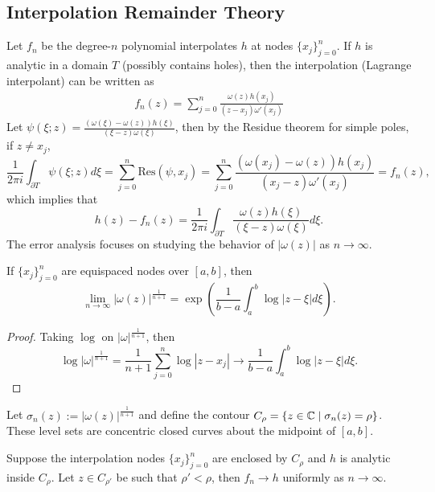 \subsection{Interpolation Remainder Theory}
\label{SSec: 2-Int-Rem-The}
Let $f_n$ be the degree-$n$ polynomial interpolates $h$ at nodes $\{x_j\}_{j=0}^n$. If $h$ is analytic in a domain $T$ (possibly contains holes),  then the interpolation (Lagrange interpolant) can be written as 
\begin{eqnarray}
    f_n(z) = \sum_{j=0}^n \frac{\omega(z) h(x_j)}{(z - x_j) \omega'(x_j)}
\end{eqnarray}
Let $\psi(\xi; z) = \frac{(\omega(\xi) - \omega(z)) h(\xi)}{(\xi - z) \omega(\xi)}$, then by the Residue theorem for simple poles, if $z \neq x_j$,  
\begin{equation}
    \frac{1}{2\pi i}\int_{\partial T} \psi(\xi; z) d\xi = \sum_{j=0}^n \mathrm{Res}(\psi, x_j) = \sum_{j=0}^n \frac{(\omega(x_j) - \omega(z)) h(x_j)}{(x_j - z)\omega'(x_j)} = f_n(z),
\end{equation}
which implies that 
\begin{equation}
    h(z) - f_n(z) = \frac{1}{2\pi i}\int_{\partial T} \frac{\omega(z) h(\xi)}{(\xi - z)\omega(\xi)} d\xi.
\end{equation}
The error analysis focuses on studying the behavior of $|\omega(z)|$ as $n\to \infty$.
\begin{lemma}
\label{Lem: 2-Ome-Lim}
    If $\{x_j\}_{j=0}^n$ are equispaced nodes over $[a, b]$, then 
    \begin{equation}
        \lim_{n\to\infty} |\omega(z)|^{\frac{1}{n+1}} = \exp\left(\frac{1}{b - a}\int_a^b \log|z-\xi| d\xi \right).
    \end{equation}
\end{lemma}
\begin{proof}
    Taking $\log$ on $|\omega|^{\frac{1}{n+1}}$, then 
    \begin{equation}
        \log |\omega|^{\frac{1}{n+1}} = \frac{1}{n+1}\sum_{j=0}^n \log |z - x_j|\to \frac{1}{b-a}\int_a^b \log|z - \xi| d\xi. 
    \end{equation}
\end{proof}
Let $\sigma_n(z):= |\omega(z)|^{\frac{1}{n+1}}$ and define the contour $C_{\rho} = \{z\in \mathbb C\mid \sigma_n(z) = \rho\}$. These level sets are concentric closed curves about the midpoint of $[a,b]$.
\begin{lemma}
\label{Lem: 2-Ana-Uni-Con}
    Suppose the interpolation nodes $\{x_j\}_{j=0}^n$ are enclosed by $C_{\rho}$ and $h$ is analytic inside $C_{\rho}$. Let $z\in C_{\rho'}$ be such that $\rho'<\rho$, then $f_n\to h$ uniformly as $n\to\infty$. 
\end{lemma}
